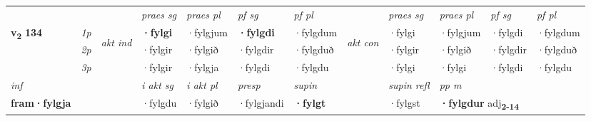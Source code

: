 \begin{longtable}[l]{X>{\footnotesize\itshape}llXXXXlXXXX}
\midrule

 & &   & \textit{praes sg}  & \textit{praes pl}    & \textit{ pf sg} & \textit{pf pl} & & \textit{praes sg}  & \textit{praes pl}    & \textit{pf sg} & \textit{pf pl }  \\ \cmidrule{4-7} \cmidrule{9-12}
 \multirow{2}{*}{{{\textbf{v{\textsubscript{2}}} \Large{\textbf{134}}}}}  & 1p & \multirow{3}{*}{\begin{turn}{90}\textit{akt ind}\end{turn}} & \textbf{·fylgi} & ·fylgjum & \textbf{·fylgdi} & ·fylgdum & \multirow{3}{*}{\begin{turn}{90}\textit{akt con}\end{turn}} &·fylgi & ·fylgjum & ·fylgdi & ·fylgdum\\*
 & 2p &  &  ·fylgir  & ·fylgið & ·fylgdir & ·fylgduð & & ·fylgir & ·fylgið & ·fylgdir & ·fylgduð \\*
 & 3p &  & ·fylgir & ·fylgja & ·fylgdi & ·fylgdu & & ·fylgi & ·fylgi& ·fylgdi & ·fylgdu \\*
\cmidrule{4-7} \cmidrule{9-12}

   {\textit{inf}} & &  & \textit{i akt sg} & \textit{i akt pl}   & \textit{presp} & \textit{supin} && \textit{supin refl} & \textit{pp m} \\*
  {\textbf{fram\allowbreak ·fylgja}} & && ·fylgdu  & ·fylgið   & ·fylgjandi &  \textbf{·fylgt} && ·fylgst & \multicolumn{2}{l}{\textbf{·fylgdur} adj\textbf{\textsubscript{2-14}}} \\*

\midrule


\end{longtable}
